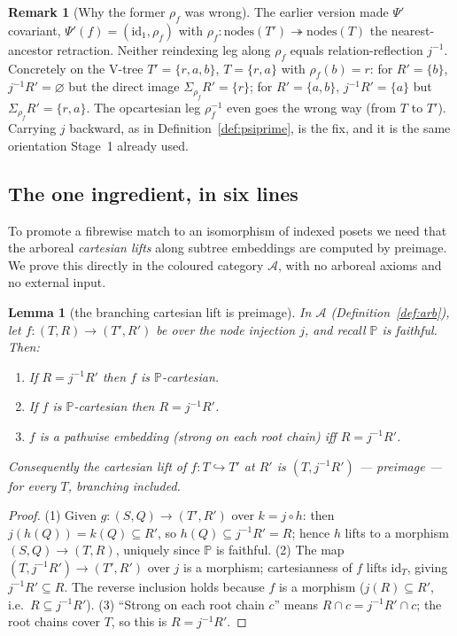 \documentclass[11pt]{article}
\newtheorem{lemma}[theorem]{Lemma}
\theoremstyle{definition}
\newtheorem{remark}[theorem]{Remark}
\newcommand{\nodes}{\mathrm{nodes}}
\newcommand{\id}{\mathrm{id}}
\newcommand{\Arb}{\mathcal{A}}
\newcommand{\Pfib}{\mathbb{P}}
\newcommand{\inpr}{\hookrightarrow}
\newcommand{\Psip}{\Psi'}
\begin{document}
\begin{remark}[Why the former $\rho_f$ was wrong]\label{rem:rhofwrong}
The earlier version made $\Psip$ covariant, $\Psip(f)=(\id_1,\rho_f)$ with
$\rho_f\colon\nodes(T')\twoheadrightarrow\nodes(T)$ the nearest-ancestor retraction. Neither
reindexing leg along $\rho_f$ equals relation-reflection $j^{-1}$. Concretely on the V-tree
$T'=\{r,a,b\}$, $T=\{r,a\}$ with $\rho_f(b)=r$: for $R'=\{b\}$, $j^{-1}R'=\varnothing$ but the direct
image $\Sigma_{\rho_f}R'=\{r\}$; for $R'=\{a,b\}$, $j^{-1}R'=\{a\}$ but $\Sigma_{\rho_f}R'=\{r,a\}$.
The opcartesian leg $\rho_f^{-1}$ even goes the wrong way (from $T$ to $T'$). Carrying $j$ backward,
as in Definition~\ref{def:psiprime}, is the fix, and it is the same orientation Stage~1 already
used.
\end{remark}

\subsection{The one ingredient, in six lines}

To promote a fibrewise match to an isomorphism of indexed posets we need that the arboreal
\emph{cartesian lifts} along subtree embeddings are computed by preimage. We prove this directly in
the coloured category $\Arb$, with no arboreal axioms and no external input.

\begin{lemma}[the branching cartesian lift is preimage]\label{lem:cartlift}
In $\Arb$ (Definition~\ref{def:arb}), let $f\colon(T,R)\to(T',R')$ be over the node injection $j$,
and recall $\Pfib$ is faithful. Then:
\begin{enumerate}
\item If $R=j^{-1}R'$ then $f$ is $\Pfib$-cartesian.
\item If $f$ is $\Pfib$-cartesian then $R=j^{-1}R'$.
\item $f$ is a pathwise embedding \textup{(}strong on each root chain\textup{)} iff $R=j^{-1}R'$.
\end{enumerate}
Consequently the cartesian lift of $f\colon T\inpr T'$ at $R'$ is $(T,j^{-1}R')$ --- preimage --- for
\emph{every} $T$, branching included.
\end{lemma}

\begin{proof}
(1) Given $g\colon(S,Q)\to(T',R')$ over $k=j\circ h$: then $j(h(Q))=k(Q)\subseteq R'$, so
$h(Q)\subseteq j^{-1}R'=R$; hence $h$ lifts to a morphism $(S,Q)\to(T,R)$, uniquely since $\Pfib$ is
faithful. (2) The map $(T,j^{-1}R')\to(T',R')$ over $j$ is a morphism; cartesianness of $f$ lifts
$\id_T$, giving $j^{-1}R'\subseteq R$. The reverse inclusion holds because $f$ is a morphism
($j(R)\subseteq R'$, i.e.\ $R\subseteq j^{-1}R'$). (3) ``Strong on each root chain $c$'' means
$R\cap c=j^{-1}R'\cap c$; the root chains cover $T$, so this is $R=j^{-1}R'$.
\end{proof}
\end{document}
